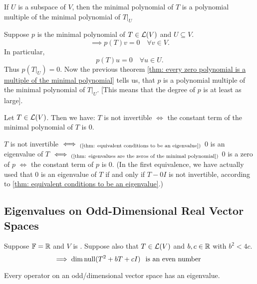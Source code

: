 \setcounter{thm}{30}
\begin{thm}
  \label{thm: minimal polynomial of a restriction operator}
  If $U$ is a subspace of $V$, then the minimal polynomial of $T$ is a polynomial multiple of the minimal polynomial of $\left .T \right | _{ U}$
\end{thm}
\begin{prf}
  Suppose $p$ is the minimal polynomial of $T\in \mathcal{L}(V)$ and $U \subseteq V$.
  \begin{equation}
    \implies p(T)v=0 \quad \forall v \in V.
  \end{equation}
  In particular,
  \begin{equation}
    p(T)u=0 \quad \forall u\in U.
  \end{equation} Thus $p\left( \left.T\right|_{U} \right)=0.$ Now the previous theorem
  \ref{thm: every zero polynomial is a multiple of the minimal polynomial} tells us, that $p$ is a polynomial multiple of the minimal polynomial of $\left. T \right |_U$. [This means that the degree of $p$ is at least as large].
\end{prf}

\begin{thm} 
  Let $T \in \mathcal{L} (V)$. Then we have: $T$ is not invertible $\iff$ the constant term of the minimal polynomial of $T$ is $0$.
\end{thm}
\begin{prf}
  $T$ is not invertible $\iff_{\text{(\ref{thm: equivalent conditions to be an eigenvalue})}}$ $0$ is an eigenvalue of $T$ $\iff_{(\text{\ref{thm: eigenvalues are the zeros of the minimal polynomial})}}$ $0$ is a zero of $p$ $\iff$ the constant term of $p$ is $0$.
  (In the first equivalence, we have actually used that $0$ is an eigenvalue of $T$ if and only if $T-0I$ is not invertible, according to \ref{thm: equivalent conditions to be an eigenvalue}.)
\end{prf}

\subsection{Eigenvalues on Odd-Dimensional Real Vector Spaces}
\begin{thm}
  Suppose $\mathbb{F} = \mathbb{R}$ and $V$ is \fd.
  Suppose also that $T \in \mathcal{L} (V)$ and $b,c \in \mathbb{R}$ with $b^2 < 4c$.
  \begin{equation}
    \implies \dim \operatorname{null} (T^2 +bT +cI) \;\;\, \text{is an even number}\;\;
  \end{equation}
\end{thm}

\begin{thm}
  Every operator on an odd\-/dimensional vector space has an eigenvalue.
\end{thm}